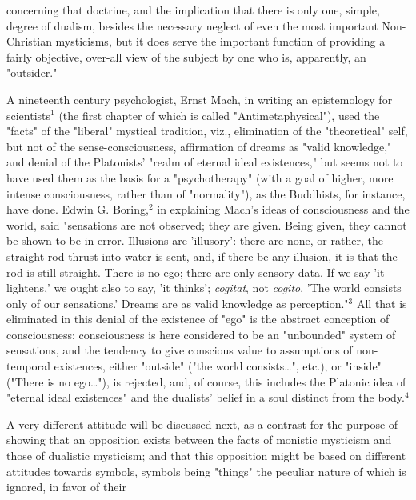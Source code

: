 \noindent concerning that doctrine, and
the implication that there is only one, simple, degree of
dualism, besides the necessary neglect of even the most important
Non-Christian mysticisms, but it does serve the important function
of providing a fairly objective, over-all view of the subject
by one who is, apparently, an "outsider."\par
\vspace*{0.5\baselineskip}
A nineteenth century psychologist, Ernst Mach, in writing
an epistemology for scientists$^{1}$ (the first chapter of
which is called "Antimetaphysical"), used the "facts" of the
"liberal" mystical tradition, viz., elimination of the "theoretical" self,
but not of the sense-consciousness, affirmation of dreams as
"valid knowledge," and denial of the Platonists' "realm of eternal ideal existences,"
but seems not to have used them as the basis for a "psychotherapy"
(with a goal of higher, more intense consciousness, rather than
of "normality"), as the Buddhists, for instance, have done. Edwin
G. Boring,$^{2}$ in explaining Mach's ideas of consciousness
and the world, said "sensations are not observed; they are given. Being given,
they cannot be shown to be in error. Illusions are 'illusory': there are none,
or rather, the straight rod thrust into water is sent, and, if there
be any illusion, it is that the rod is still straight. There is no ego;
there are only sensory data. If we say 'it lightens,' we ought also to say, 'it thinks';
\textit{cogitat}, not \textit{cogito}. 'The world consists only of our sensations.'
Dreams are as valid knowledge as perception."$^{3}$ All that
is eliminated in this denial of the existence of "ego" is
the abstract conception of consciousness: consciousness is
here considered to be an "unbounded" system of sensations, and
the tendency to give conscious value to assumptions of
non-temporal existences, either "outside" ("the world consists\dots", etc.),
or "inside" ("There is no ego\dots"), is
rejected, and, of course, this includes the Platonic idea
of "eternal ideal existences" and the dualists' belief in
a soul distinct from the body.$^{4}$\par
\vspace*{0.5\baselineskip}
A very different attitude will be discussed next, as a
contrast for the purpose of showing that an opposition exists
between the facts of monistic mysticism and those of dualistic
mysticism; and that this opposition might be based on different
attitudes towards symbols, symbols being "things" the
peculiar nature of which is ignored, in favor of their
